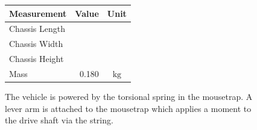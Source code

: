 \documentclass[a4paper]{article}
\begin{document}
\begin{figure}[h]
	\centering
	\begin{minipage}{0.45\textwidth}
		\centering
		\caption{The vehicle is powered by the torsional spring in the mousetrap. A lever arm is attached to the mousetrap which applies a moment to the drive shaft via the string.}
	\end{minipage}
	\hspace{1cm}
	\begin{minipage}{0.45\textwidth}
		\centering
		\begin{tabular}{p{3cm}rc}
			\toprule
			Measurement & Value & Unit \\
			\midrule
			Chassis Length & & \\
			Chassis Width & & \\
			Chassis Height & & \\
			Mass & 0.180 & $\si{\kilogram}$ \\
			\bottomrule
		\end{tabular}
	\end{minipage}	
\end{figure}
\end{document}
